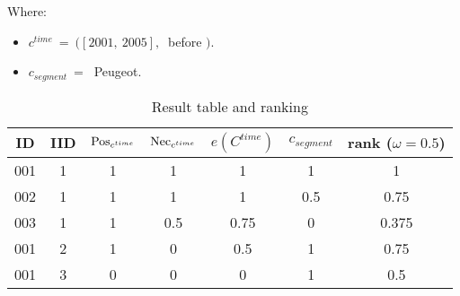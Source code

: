 \begin{example}
Where:
\begin{itemize}
\item
$c^{time}\ = \ ( \left[ 2001,\ 2005 \right],\ $  before $)$.
\item
$c_{segment}\ = \ $ Peugeot.
\end{itemize}



\begin{table}[ht]
\caption{Result table and ranking}
\centering
\begin{tabular}{c c c c c c c}
\hline
ID & IID &  $\operatorname{Pos}_{c^{time}}$ &$\operatorname{Nec}_{c^{time}}$ & $e(C^{time})$ & $c_{segment}$ & rank ($\omega=0.5$) \\ [0.5ex]
\hline
001 & 1 & 1 &  1 & 1 & 1 & 1 \\
002 & 1 & 1 & 1 & 1 & 0.5 & 0.75 \\
003 & 1 & 1 & 0.5 & 0.75 &0 & 0.375\\
001 & 2 & 1 & 0 & 0.5 &1 & 0.75 \\
001 & 3 & 0 & 0 & 0 &1 & 0.5\\
\hline
\end{tabular}
\label{tb:results}
\end{table}
\end{example}





